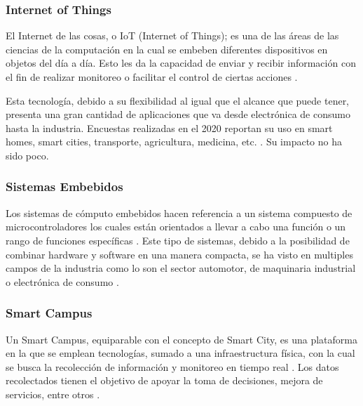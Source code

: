 \documentclass[12pt]{article}
\begin{document}
    \subsubsection{Internet of Things}


    El Internet de las cosas, o IoT (Internet of Things); es una de las áreas de las ciencias de la computación en la cual  se embeben diferentes dispositivos en objetos del día a día. Esto les da la capacidad de enviar y recibir información con el fin de realizar monitoreo o facilitar el control de ciertas acciones \cite{Berte_2018}.

    Esta tecnología, debido a su flexibilidad al igual que el alcance que puede tener, presenta una gran cantidad de aplicaciones que va desde electrónica de consumo hasta la industria. Encuestas realizadas en el 2020 reportan su uso en smart homes, smart cities, transporte, agricultura, medicina, etc. \cite{Dawood_2020}. Su impacto no ha sido poco.

    \subsubsection*{Sistemas Embebidos}
    

    Los sistemas de cómputo embebidos hacen referencia a un sistema compuesto de microcontroladores los cuales están orientados a llevar a cabo una función o un rango de funciones específicas \cite{heath2002embedded}. Este tipo de sistemas, debido a la posibilidad de combinar hardware y software en una manera compacta, se ha visto en multiples campos de la industria como lo son el sector automotor, de maquinaria industrial o electrónica de consumo \cite{deichmann_2022}.


    \subsubsection*{Smart Campus}


    Un Smart Campus, equiparable con el concepto de Smart City, es una plataforma en la que se emplean tecnologías, sumado a una infraestructura física, con la cual se busca la recolección de información y monitoreo en tiempo real \cite{MinAllah2020}. Los datos recolectados tienen el objetivo de apoyar la toma de decisiones, mejora de servicios, entre otros \cite{Anagnostopoulos_2023}.
\end{document}
